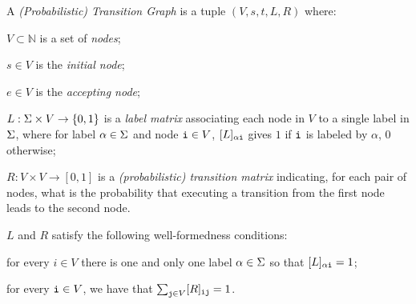 \begin{definition} A \emph{(Probabilistic) Transition Graph} is a tuple $(V,s,t,L,R)$ where:
  \begin{inparaenum}[\itshape (i)]
    \item $V \subset \mathbb{N}$ is a set of \emph{nodes};
    \item $s\in V$ is the \emph{initial node};
    \item $e\in V$ is the \emph{accepting node};
    \item $L: \Sigma \times V \rightarrow \{0,1\}$ is a \emph{label matrix} associating each node in $V$ to a single label in $\Sigma$, where for label $\alpha \in \Sigma$ and node $\textnormal{\texttt{i}} \in V$, $[L]_{\alpha\textnormal{\texttt{i}}}$ gives $1$ if $\textnormal{\texttt{i}}$ is labeled by $\alpha$, $0$ otherwise;
    \item $R: V \times V \rightarrow [0,1]$ is a \emph{(probabilistic) transition matrix} indicating, for each pair of nodes, what is the probability that executing a transition from the first node leads to the second node.
  \end{inparaenum}
$L$ and $R$ satisfy the following well-formedness conditions:
\begin{inparaenum}[\itshape (i)]
\item for every $i \in V$ there is one and only one label $\alpha \in \Sigma$ so   that $[L]_{\alpha\textnormal{\texttt{i}}}=1$;
\item  for  every $\textnormal{\texttt{i}} \in V$, we have that $\sum_{\textnormal{\texttt{j}}\in V}[R]_{\textnormal{\texttt{ij}}}=1$.
\end{inparaenum}

\end{definition}

